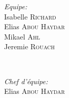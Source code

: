 \documentclass[a4paper,11pt]{article}
\theoremstyle{plain}
\begin{document}
\begin{titlepage}
\begin{minipage}{0.4\textwidth}
\begin{flushleft} \large
\emph{Equipe:}\\
Isabelle \textsc{Richard}\\
Elias \textsc{Abou Haydar}\\
Mikael \textsc{Ahl}\\
Jeremie \textsc{Rouach}\\
\end{flushleft}
\end{minipage}
\\
\begin{minipage}{0.4\textwidth}
\begin{flushright} \large
\emph{Chef d'équipe:}\\
Elias \textsc{Abou Haydar}
\end{flushright}
\end{minipage}


\endcenter

\end{titlepage}

\tableofcontents

\newpage

\end{document}
